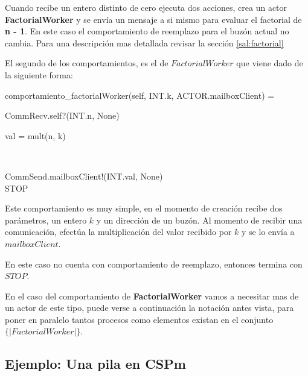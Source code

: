 Cuando recibe un entero distinto de cero ejecuta dos acciones, crea un actor \textbf{FactorialWorker} y se envía un mensaje a si mismo para evaluar el factorial de \textbf{n - 1}. En este caso el comportamiento de reemplazo para el buzón actual no cambia. Para una descripción mas detallada revisar la sección \ref{sal:factorial}

El segundo de los comportamientos, es el de $FactorialWorker$ que viene dado de la siguiente forma:

\begin{process}
comportamiento_{factorialWorker}(self, INT.k, ACTOR.mailboxClient) = {} \\ \quad
  \begin{block}
  CommRecv.self?(INT.n, None) \then {} \\ \quad
    \begin{block}
    \begin{declaration}
    val = mult(n, k) 
    \end{declaration} \\
    \begin{within}
    CommSend.mailboxClient!(INT.val, None) \then \\
    STOP
    \end{within}
    \end{block}
  \end{block}
\end{process}

Este comportamiento es muy simple, en el momento de creación recibe dos parámetros, un entero $k$ y un dirección de un buzón. Al momento de recibir una comunicación, efectúa la multiplicación del valor recibido por $k$ y se lo envía a $mailboxClient$.

En este caso no cuenta con comportamiento de reemplazo, entonces termina con $STOP$.

En el caso del comportamiento de \textbf{FactorialWorker} vamos a necesitar mas de un actor de este tipo, puede verse a continuación la notación antes vista, para poner en paralelo tantos procesos como elementos existan en el conjunto $\{|FactorialWorker|\}$.

\subsection{Ejemplo: Una pila en CSPm}


